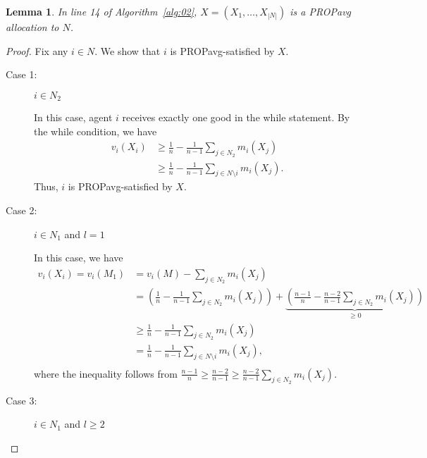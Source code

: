\documentclass[11pt]{article}
\newtheorem{lemma}[theorem]{Lemma}
\newcommand{\PROPavg}{\textsf{PROPavg}\xspace}
\begin{document}
\begin{lemma}\label{lem: com}
In line 14 of Algorithm~\ref{alg:02}, $X=(X_1,\ldots, X_{|N|})$ is a \PROPavg allocation to $N$.
\end{lemma}
\begin{proof}
Fix any $i\in N$. We show that $i$ is \PROPavg-satisfied by $X$.

\begin{description}
\item[Case 1:]  $i \in N_2$

In this case, agent $i$ receives exactly one good in the while statement.
By the while condition, we have 
\begin{align*}
v_i(X_i) &\ge \frac{1}{n}-\frac{1}{n-1}\sum_{j\in N_2} m_i(X_j)\\
& \ge \frac{1}{n}-\frac{1}{n-1}\sum_{j\in N\setminus i} m_i(X_j).
\end{align*}
Thus, $i$ is \PROPavg-satisfied by $X$.

\item[Case 2:] $i\in N_1$ and $l=1$

In this case, we have
\begin{align*}
v_i(X_i) =v_i(M_1)&= v_i(M)-\sum_{j\in N_2} m_i(X_j)\\
& =  \left(\frac{1}{n}-\frac{1}{n-1}\sum_{j\in N_2} m_i(X_j)\right)+\underbrace{\left(\frac{n-1}{n}-\frac{n-2}{n-1}\sum_{j\in N_2} m_i(X_j)\right)}_{\ge 0}\\
&\ge \frac{1}{n}-\frac{1}{n-1}\sum_{j\in N_2} m_i(X_j) \\
&= \frac{1}{n}-\frac{1}{n-1}\sum_{j\in N\setminus i} m_i(X_j), \\ 
\end{align*}
where the inequality follows from $\frac{n-1}{n}\ge \frac{n-2}{n-1}\ge \frac{n-2}{n-1}\sum_{j\in N_2} m_i(X_j)$.
\item[Case 3:]  $i \in N_1$ and $l\ge 2$


\end{description}
\end{proof}
\end{document}
